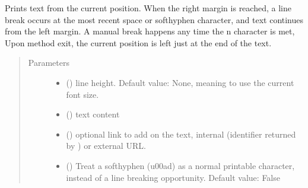 \documentclass[letterpaper,10pt,english]{sphinxmanual}
\begin{document}
\begin{fulllineitems}
\begin{fulllineitems}
\label{\detokenize{generated/quality_assessment.quality_pdf_report.DefectReportPDF.write:quality_assessment.quality_pdf_report.DefectReportPDF.write}}
\sphinxAtStartPar
Prints text from the current position.
When the right margin is reached, a line break occurs at the most recent
space or soft\sphinxhyphen{}hyphen character, and text continues from the left margin.
A manual break happens any time the n character is met,
Upon method exit, the current position is left just at the end of the text.
\begin{quote}\begin{description}
\item[{Parameters}] \leavevmode\begin{itemize}
\item {} 
\sphinxAtStartPar
{} () \textendash{} line height. Default value: None, meaning to use the current font size.

\item {} 
\sphinxAtStartPar
{} () \textendash{} text content

\item {} 
\sphinxAtStartPar
{} () \textendash{} optional link to add on the text, internal
(identifier returned by ) or external URL.

\item {} 
\sphinxAtStartPar
{} () \textendash{} Treat a soft\sphinxhyphen{}hyphen (u00ad) as a normal printable
character, instead of a line breaking opportunity. Default value: False

\end{itemize}

\end{description}\end{quote}

\end{fulllineitems}


\end{fulllineitems}
\end{document}
